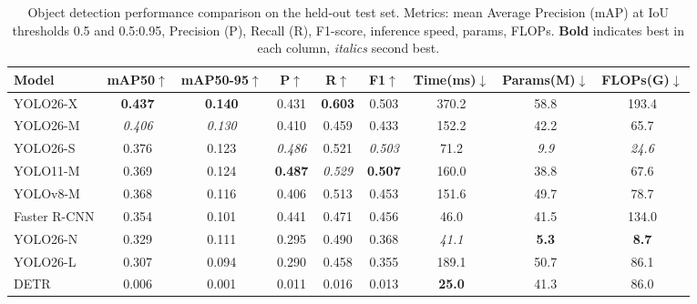 \begin{table}[t]
\centering
\caption{Object detection performance comparison on the held-out test set. Metrics: mean Average Precision (mAP) at IoU thresholds 0.5 and 0.5:0.95, Precision (P), Recall (R), F1-score, inference speed, params, FLOPs. \textbf{Bold} indicates best in each column, \textit{italics} second best.}
\label{tab:main_results}
\small
\begin{tabular}{lcccccccc}
\toprule
Model & mAP50$\uparrow$ & mAP50-95$\uparrow$ & P$\uparrow$ & R$\uparrow$ & F1$\uparrow$ & Time(ms)$\downarrow$ & Params(M)$\downarrow$ & FLOPs(G)$\downarrow$ \\
\midrule
YOLO26-X & \textbf{0.437} & \textbf{0.140} & 0.431 & \textbf{0.603} & 0.503 & 370.2 & 58.8 & 193.4 \\
YOLO26-M & \textit{0.406} & \textit{0.130} & 0.410 & 0.459 & 0.433 & 152.2 & 42.2 & 65.7 \\
YOLO26-S & 0.376 & 0.123 & \textit{0.486} & 0.521 & \textit{0.503} & 71.2 & \textit{9.9} & \textit{24.6} \\
YOLO11-M & 0.369 & 0.124 & \textbf{0.487} & \textit{0.529} & \textbf{0.507} & 160.0 & 38.8 & 67.6 \\
YOLOv8-M & 0.368 & 0.116 & 0.406 & 0.513 & 0.453 & 151.6 & 49.7 & 78.7 \\
Faster R-CNN & 0.354 & 0.101 & 0.441 & 0.471 & 0.456 & 46.0 & 41.5 & 134.0 \\
YOLO26-N & 0.329 & 0.111 & 0.295 & 0.490 & 0.368 & \textit{41.1} & \textbf{5.3} & \textbf{8.7} \\
YOLO26-L & 0.307 & 0.094 & 0.290 & 0.458 & 0.355 & 189.1 & 50.7 & 86.1 \\
DETR & 0.006 & 0.001 & 0.011 & 0.016 & 0.013 & \textbf{25.0} & 41.3 & 86.0 \\
\bottomrule
\end{tabular}
\end{table}
